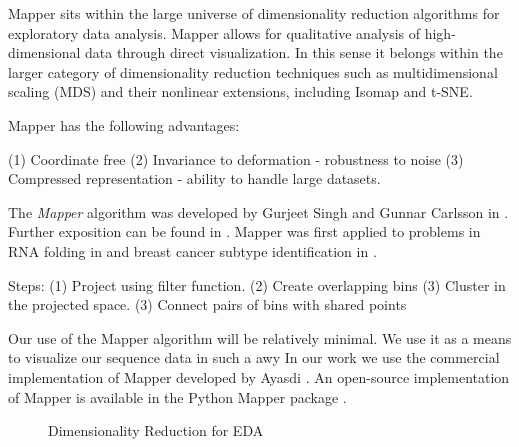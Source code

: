 Mapper sits within the large universe of dimensionality reduction algorithms for exploratory data analysis.
Mapper allows for qualitative analysis of high-dimensional data through direct visualization.
In this sense it belongs within the larger category of dimensionality reduction techniques such as multidimensional scaling (MDS) and their nonlinear extensions, including Isomap and t-SNE.

Mapper has the following advantages:

(1) Coordinate free
(2) Invariance to deformation - robustness to noise
(3) Compressed representation - ability to handle large datasets.

The \emph{Mapper} algorithm was developed by Gurjeet Singh and Gunnar Carlsson in \cite{Singh:2007ve}.
Further exposition can be found in \cite{Lum:2013cz}.
Mapper was first applied to problems in RNA folding in \cite{Bowman:2008esa} and breast cancer subtype identification in \cite{Nicolau:2011}.

Steps:
(1) Project using filter function.
(2) Create overlapping bins
(3) Cluster in the projected space.
(3) Connect pairs of bins with shared points

Our use of the Mapper algorithm will be relatively minimal.
We use it as a means to visualize our sequence data in such a awy
In our work we use the commercial implementation of Mapper developed by Ayasdi \cite{AyasdiIris:2015}.
An open-source implementation of Mapper is available in the Python Mapper package \cite{Mullner:2013}.

\begin{figure}
\caption[Dimensionality Reduction for EDA]{Dimensionality Reduction for EDA}
\label{fig:bg:eda}
\end{figure}

